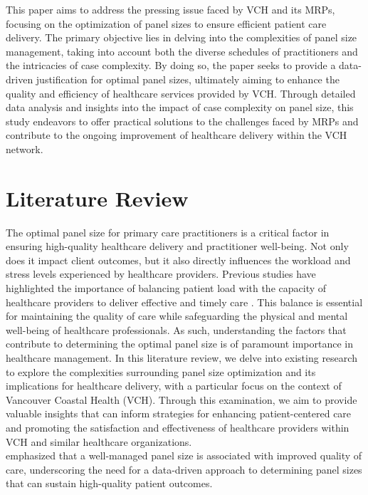 \documentclass[11pt]{article}
\theoremstyle{definition}
\begin{document}
This paper aims to address the pressing issue faced by VCH and its MRPs, focusing on the optimization of panel sizes to ensure efficient patient care delivery. The primary objective lies in delving into the complexities of panel size management, taking into account both the diverse schedules of practitioners and the intricacies of case complexity. By doing so, the paper seeks to provide a data-driven justification for optimal panel sizes, ultimately aiming to enhance the quality and efficiency of healthcare services provided by VCH. Through detailed data analysis and insights into the impact of case complexity on panel size, this study endeavors to offer practical solutions to the challenges faced by MRPs and contribute to the ongoing improvement of healthcare delivery within the VCH network.\\

\section{Literature Review}

The optimal panel size for primary care practitioners is a critical factor in ensuring high-quality healthcare delivery and practitioner well-being. Not only does it impact client outcomes, but it also directly influences the workload and stress levels experienced by healthcare providers. Previous studies have highlighted the importance of balancing patient load with the capacity of healthcare providers to deliver effective and timely care \cite{dahrouge2016, harrington2022}. This balance is essential for maintaining the quality of care while safeguarding the physical and mental well-being of healthcare professionals. As such, understanding the factors that contribute to determining the optimal panel size is of paramount importance in healthcare management. In this literature review, we delve into existing research to explore the complexities surrounding panel size optimization and its implications for healthcare delivery, with a particular focus on the context of Vancouver Coastal Health (VCH). Through this examination, we aim to provide valuable insights that can inform strategies for enhancing patient-centered care and promoting the satisfaction and effectiveness of healthcare providers within VCH and similar healthcare organizations.\\

\cite{dahrouge2016} emphasized that a well-managed panel size is associated with improved quality of care, underscoring the need for a data-driven approach to determining panel sizes that can sustain high-quality patient outcomes.\\
\end{document}

